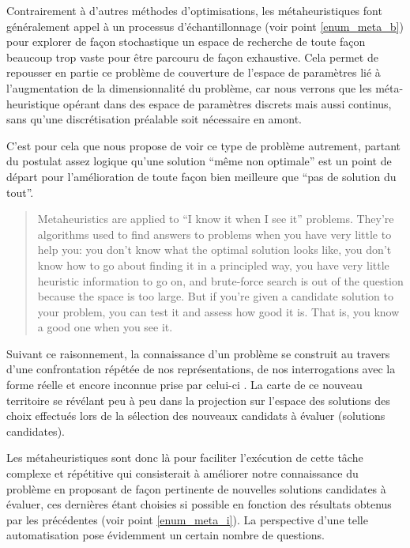 


Contrairement à d'autres méthodes d'optimisations, les métaheuristiques font généralement appel à un processus d'échantillonnage (voir point \ref{enum_meta_b}) pour explorer de façon stochastique un espace de recherche de toute façon beaucoup trop vaste pour être parcouru de façon exhaustive. Cela permet de repousser en partie ce problème de couverture de l'espace de paramètres lié à l'augmentation de la dimensionnalité du problème, car nous verrons que les méta-heuristique opérant dans des espace de paramètres discrets mais aussi continus, sans qu'une discrétisation préalable soit nécessaire en amont.

C'est pour cela que \textcite[7]{Luke2013} nous propose de voir ce type de problème autrement, partant du postulat assez logique qu'une solution \enquote{même non optimale} est un point de départ pour l'amélioration de toute façon bien meilleure que \enquote{pas de solution du tout}.

\foreignblockquote{english}[{\cite[7]{Luke2013}}]{ Metaheuristics are applied to \enquote{I know it when I see it} problems. They're algorithms used to find answers to problems when you have very little to help you: you don't know what the optimal solution looks like, you don't know how to go about finding it in a principled way, you have very little heuristic information to go on, and brute-force search is out of the question because the space is too large. But if you're given a candidate solution to your problem, you can test it and assess how good it is. That is, you know a good one when you see it.}

Suivant ce raisonnement, la connaissance d'un problème se construit au travers d'une confrontation répétée de nos représentations, de nos interrogations avec la forme réelle et encore inconnue prise par celui-ci . La carte de ce nouveau territoire se révélant peu à peu dans la projection sur l'espace des solutions des choix effectués lors de la sélection des nouveaux candidats à évaluer (solutions candidates).

Les métaheuristiques sont donc là pour faciliter l'exécution de cette tâche complexe et répétitive qui consisterait à améliorer notre connaissance du problème en proposant de façon pertinente de nouvelles solutions candidates à évaluer, ces dernières étant choisies si possible en fonction des résultats obtenus par les précédentes (voir point \ref{enum_meta_i}). La perspective d'une telle automatisation pose évidemment un certain nombre de questions.

